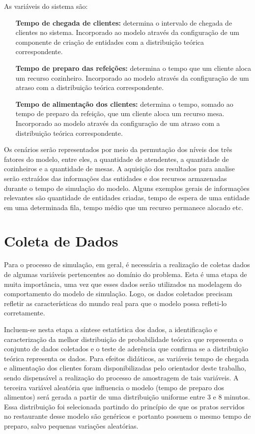 \documentclass[pt,disc,oneside]{ufscpgeasthesis}
\begin{document}
			As variáveis do sistema são:

			\begin{itemize}
				\item[\textbf{Tempo de chegada de clientes:}] determina o intervalo de chegada de clientes no sistema. Incorporado ao modelo através da configuração de um componente de criação de entidades com a distribuição teórica correspondente.
				\item[\textbf{Tempo de preparo das refeições:}] determina o tempo que um cliente aloca um recurso cozinheiro. Incorporado ao modelo através da configuração de um atraso com a distribuição teórica correspondente.
				\item[\textbf{Tempo de alimentação dos clientes:}] determina o tempo, somado ao tempo de preparo da refeição, que um cliente aloca um recurso mesa. Incorporado ao modelo através da configuração de um atraso com a distribuição teórica correspondente.
			\end{itemize}
			
			Os cenários serão representados por meio da permutação dos níveis dos três fatores do modelo, entre eles, a quantidade de atendentes, a quantidade de cozinheiros e a quantidade de mesas.
			A aquisição dos resultados para analise serão extraídos das informações das entidades e dos recursos armazenadas durante o tempo de simulação do modelo.
			Alguns exemplos gerais de informações relevantes são quantidade de entidades criadas, tempo de espera de uma entidade em uma determinada fila, tempo médio que um recurso permanece alocado etc.

		\section{Coleta de Dados}
		\label{sec:coleta}

            Para o processo de simulação, em geral, é necessária a realização de coletas dados de algumas variáveis pertencentes ao domínio do problema.
            Esta é uma etapa de muita importância, uma vez que esses dados serão utilizados na modelagem do comportamento do modelo de simulação.
            Logo, os dados coletados precisam refletir as características do mundo real para que o modelo possa refleti-lo corretamente. 
            
            Incluem-se nesta etapa a síntese estatística dos dados, a identificação e caracterização da melhor distribuição de probabilidade teórica que representa o conjunto de dados coletados e o teste de aderência que confirma se a distribuição teórica representa os dados.
            Para efeitos didáticos, as variáveis tempo de chegada e alimentação dos clientes foram disponibilizadas pelo orientador deste trabalho, sendo dispensável a realização do processo de amostragem de tais variáveis.
            A terceira variável aleatória que influencia o modelo (tempo de preparo dos alimentos) será gerada a partir de uma distribuição uniforme entre 3 e 8 minutos.
            Essa distribuição foi selecionada partindo do princípio de que os pratos servidos no restaurante desse modelo são genéricos e portanto possuem o mesmo tempo de preparo, salvo pequenas variações aleatórias.
\end{document}
